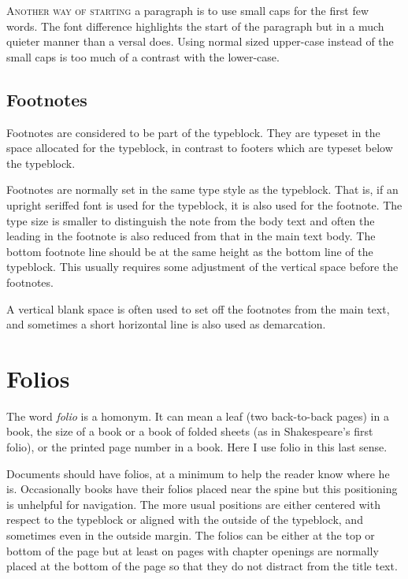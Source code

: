 \documentclass[10pt,letterpaper,extrafontsizes]{memoir}
\begin{document}
\noindent \textsc{Another way of starting} a paragraph is to use small
caps for the first few words. The font difference highlights the start
of the paragraph but in a much quieter manner than a versal does. Using
normal sized upper-case instead of the small caps is too much of a 
contrast with the lower-case.


\subsection{Footnotes}

    Footnotes are considered to be part of the typeblock. 
They are typeset in the space allocated for the typeblock, 
in contrast to footers
which are typeset below the typeblock.

    Footnotes are normally set in the same type style as the 
typeblock. That is, if an upright seriffed font is used 
for the typeblock, it is
also used for the footnote. The
type size is smaller to distinguish the note from the body text and often
the leading in the footnote is also reduced from that in the main text body.
The bottom footnote line should be at the same height as the bottom line
of the typeblock. This usually requires some adjustment 
of the vertical space before the footnotes.

    A vertical blank space is often used to set off the footnotes from the
main text, and sometimes a short horizontal line is also used as demarcation.


\section{Folios}


    The word \emph{folio} is a homonym. It can mean a leaf 
(two back-to-back pages) in a book, the size of a book or a book of
folded sheets (as in Shakespeare's first folio), or the printed page number
in a book. Here I use folio in this last sense.

    Documents should have folios, at a minimum to help the reader know where
he is. Occasionally books have their folios placed near the spine but this
positioning is unhelpful for navigation. The more usual positions are
either centered with respect to the typeblock or aligned 
with the outside of the typeblock, and sometimes even in 
the outside margin. The folios
can be either at the top or bottom of the page but at least on pages 
with chapter openings are normally placed at the bottom of 
the page so that they do not distract from the title text.
\end{document}
